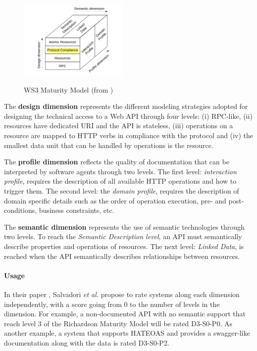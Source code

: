 \begin{figure}[ht]
  \caption{WS3 Maturity Model (from \cite{7195633})}
  \centering
  \includegraphics[width=0.47\textwidth]{figures/ws3-maturity-model.png}
  \label{WS3}
\end{figure}

The \textbf{design dimension} represents the different modeling strategies adopted for designing the technical access to a Web API through four levels:
(i) RPC-like, (ii) resources have dedicated URI and the API is stateless, (iii) operations on a resource are mapped to HTTP verbs in compliance with the protocol and (iv) the smallest data unit that can be handled by operations is the resource.

The \textbf{profile dimension} reflects the quality of documentation that can be interpreted by software agents through two levels. The first level: \textit{interaction profile}, requires the description of all available HTTP operations and how to trigger them. The second level: the \textit{domain profile}, requires the description of domain specific details such as the order of operation execution, pre- and post-conditions, business constraints, etc.

The \textbf{semantic dimension} represents the use of semantic technologies through two levels. To reach the \textit{Semantic Description level}, an API must semantically describe properties and operations of resources. The next level: \textit{Linked Data}, is reached when the API semantically describes relationships between resources.

\paragraph{Usage}
In their paper \cite{7195633}, Salvadori \emph{et al.} propose to rate systems along each dimension independently, with a score going from 0 to the number of levels in the dimension.
For example, a non-documented API with no semantic support that reach level 3 of the Richardson Maturity Model will be rated D3-S0-P0. As another example, a system that supports HATEOAS and provides a swagger-like documentation along with the data is rated D3-S0-P2.


